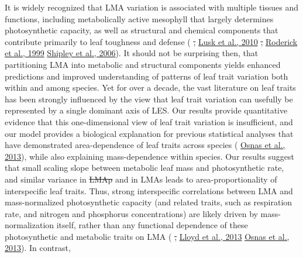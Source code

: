 \documentclass[
  12pt,
  a4paper,
,tablecaptionabove
]{scrartcl}
\providecommand{\DIFaddtex}[1]{{\protect\color{blue}\uwave{#1}}} %
\providecommand{\DIFdeltex}[1]{{\protect\color{red}\sout{#1}}}                      %
\providecommand{\DIFaddbegin}{} %
\providecommand{\DIFaddend}{} %
\providecommand{\DIFdelbegin}{} %
\providecommand{\DIFdelend}{} %
\providecommand{\DIFadd}[1]{\texorpdfstring{\DIFaddtex{#1}}{#1}} %
\providecommand{\DIFdel}[1]{\texorpdfstring{\DIFdeltex{#1}}{}} %
\newcommand{\DIFscaledelfig}{0.5}
\newlength{\DIFdelgraphicswidth} %
\newlength{\DIFdelgraphicsheight} %
\newcommand{\DIFaddincludegraphics}[2][]{{\color{blue}\fbox{\DIFOincludegraphics[#1]{#2}}}} %
\newcommand{\DIFdelincludegraphics}[2][]{%
\sbox{\DIFdelgraphicsbox}{\DIFOincludegraphics[#1]{#2}}%
\settoboxwidth{\DIFdelgraphicswidth}{\DIFdelgraphicsbox} %
\settoboxtotalheight{\DIFdelgraphicsheight}{\DIFdelgraphicsbox} %
\scalebox{\DIFscaledelfig}{%
\parbox[b]{\DIFdelgraphicswidth}{\usebox{\DIFdelgraphicsbox}\\[-\baselineskip] \rule{\DIFdelgraphicswidth}{0em}}\llap{\resizebox{\DIFdelgraphicswidth}{\DIFdelgraphicsheight}{%
\setlength{\unitlength}{\DIFdelgraphicswidth}%
\begin{picture}(1,1)%
\thicklines\linethickness{2pt} %
{\color[rgb]{1,0,0}\put(0,0){\framebox(1,1){}}}%
{\color[rgb]{1,0,0}\put(0,0){\line( 1,1){1}}}%
{\color[rgb]{1,0,0}\put(0,1){\line(1,-1){1}}}%
\end{picture}%
}\hspace*{3pt}}} %
} %
\DeclareRobustCommand{\DIFaddbegin}{\DIFOaddbegin \let\includegraphics\DIFaddincludegraphics} %
\DeclareRobustCommand{\DIFaddend}{\DIFOaddend \let\includegraphics\DIFOincludegraphics} %
\DeclareRobustCommand{\DIFdelbegin}{\DIFOdelbegin \let\includegraphics\DIFdelincludegraphics} %
\DeclareRobustCommand{\DIFdelend}{\DIFOaddend \let\includegraphics\DIFOincludegraphics} %
\begin{document}
It is widely recognized that LMA variation is associated with multiple
tissues and functions, including metabolically active mesophyll that
largely determines photosynthetic capacity, as well as structural and
chemical components that contribute primarily to leaf toughness and
defense (\protect\DIFdelbegin %
\DIFdel{,
}\DIFdelend \DIFaddbegin \hyperlink{ref-Lusk2010}{Lusk et al., 2010}\DIFadd{;
}\DIFaddend \protect\DIFdelbegin %
\DIFdel{,
}\DIFdelend \DIFaddbegin \hyperlink{ref-Roderick1999}{Roderick et al., 1999}\DIFadd{;
}\DIFaddend \protect\DIFdelbegin %
\DIFdelend \DIFaddbegin \hyperlink{ref-Shipley2006}{Shipley et al., 2006}\DIFaddend ). It should
not be surprising then, that partitioning LMA into metabolic and
structural components yields enhanced predictions and improved
understanding of patterns of leaf trait variation both within and among
species. Yet for over a decade, the vast literature on leaf traits has
been strongly influenced by the view that leaf trait variation can
usefully be represented by a single dominant axis of LES. Our results
provide quantitative evidence that this one-dimensional view of leaf
trait variation is insufficient, and our model provides a biological
explanation for previous statistical analyses that have demonstrated
area-dependence of leaf traits across species
(\protect\DIFdelbegin %
\DIFdelend \DIFaddbegin \hyperlink{ref-Osnas2013}{Osnas et al., 2013}\DIFaddend ), while also
explaining mass-dependence within species. Our results suggest that
small scaling slope between metabolic leaf mass and photosynthetic rate,
and similar variance in \DIFdelbegin \DIFdel{LMAp }\DIFdelend \DIFaddbegin \DIFadd{LMAm }\DIFaddend and in LMAs leads to area-proportionality
of interspecific leaf traits. Thus, strong interspecific correlations
between LMA and mass-normalized photosynthetic capacity (and related
traits, such as respiration rate, and nitrogen and phosphorus
concentrations) are likely driven by mass-normalization itself, rather
than any functional dependence of these photosynthetic and metabolic
traits on LMA (\protect\DIFdelbegin %
\DIFdel{,
}\DIFdelend \DIFaddbegin \hyperlink{ref-Lloyd2013}{Lloyd et al., 2013}\DIFadd{;
}\DIFaddend \protect\DIFdelbegin %
\DIFdelend \DIFaddbegin \hyperlink{ref-Osnas2013}{Osnas et al., 2013}\DIFaddend ). In contrast,
\end{document}
